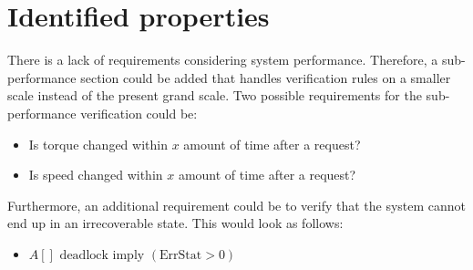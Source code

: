 \section{Identified properties}\label{sec:identified_properties}

There is a lack of requirements considering system performance. Therefore, a sub-performance section could be added that handles verification rules on a smaller scale instead of the present grand scale. Two possible requirements for the sub-performance verification could be:

\begin{itemize}
    \item Is torque changed within $x$ amount of time after a request?
    \item Is speed changed within $x$ amount of time after a request?
\end{itemize}
\vspace{1em}

Furthermore, an additional requirement could be to verify that the system cannot end up in an irrecoverable state. This would look as follows:

\begin{itemize}
    \item $A[] \text{ deadlock imply } (\text{ErrStat} > 0)$
\end{itemize}
